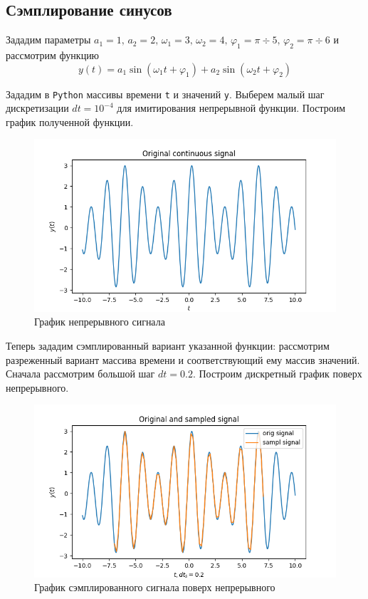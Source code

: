 \documentclass[a4paper, 12pt]{article}
\begin{document}
    \subsection{Сэмплирование синусов}
    Зададим параметры $a_1=1,\,a_2=2,\,\omega_1=3,\,\omega_2=4,\,\varphi_1=\pi\div5,\,\varphi_2=\pi\div6$ и рассмотрим функцию
    $$y(t)=a_1\sin{(\omega_1t+\varphi_1)}+a_2\sin{(\omega_2t+\varphi_2)}$$


    Зададим в \texttt{Python} массивы времени \texttt{t} и значений \texttt{y}. Выберем малый шаг дискретизации $dt=10^{-4}$ для
    имитирования непрерывной функции. Построим график полученной функции.
    \begin{figure}[H]
        \centering
        \includegraphics[scale=0.45]{orig1.png}
        \captionsetup{skip=0pt}
        \caption{График непрерывного сигнала}
        \label{fig:orig1}
    \end{figure}


    Теперь зададим сэмплированный вариант указанной функции: рассмотрим
    разреженный вариант массива времени и соответствующий ему массив значений.
    Сначала рассмотрим большой шаг $dt=0.2$.
    Построим дискретный график поверх непрерывного.
    \begin{figure}[H]
        \centering
        \includegraphics[scale=0.45]{1_sine.png}
        \captionsetup{skip=0pt}
        \caption{График сэмплированного сигнала поверх непрерывного}
        \label{fig:1sine}
    \end{figure}
\end{document}
